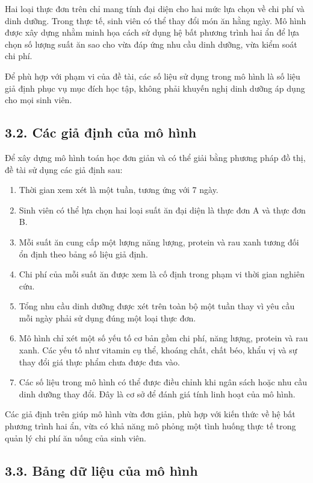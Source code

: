 \documentclass[12pt,a4paper]{article}
\begin{document}
Hai loại thực đơn trên chỉ mang tính đại diện cho hai mức lựa chọn về chi phí và dinh dưỡng. Trong thực tế, sinh viên có thể thay đổi món ăn hằng ngày. Mô hình được xây dựng nhằm minh họa cách sử dụng hệ bất phương trình hai ẩn để lựa chọn số lượng suất ăn sao cho vừa đáp ứng nhu cầu dinh dưỡng, vừa kiểm soát chi phí.

Để phù hợp với phạm vi của đề tài, các số liệu sử dụng trong mô hình là số liệu giả định phục vụ mục đích học tập, không phải khuyến nghị dinh dưỡng áp dụng cho mọi sinh viên.

\subsection*{3.2. Các giả định của mô hình}

Để xây dựng mô hình toán học đơn giản và có thể giải bằng phương pháp đồ thị, đề tài sử dụng các giả định sau:
\begin{enumerate}
    \item Thời gian xem xét là một tuần, tương ứng với 7 ngày.
    \item Sinh viên có thể lựa chọn hai loại suất ăn đại diện là thực đơn A và thực đơn B.
    \item Mỗi suất ăn cung cấp một lượng năng lượng, protein và rau xanh tương đối ổn định theo bảng số liệu giả định.
    \item Chi phí của mỗi suất ăn được xem là cố định trong phạm vi thời gian nghiên cứu.
    \item Tổng nhu cầu dinh dưỡng được xét trên toàn bộ một tuần thay vì yêu cầu mỗi ngày phải sử dụng đúng một loại thực đơn.
    \item Mô hình chỉ xét một số yếu tố cơ bản gồm chi phí, năng lượng, protein và rau xanh. Các yếu tố như vitamin cụ thể, khoáng chất, chất béo, khẩu vị và sự thay đổi giá thực phẩm chưa được đưa vào.
    \item Các số liệu trong mô hình có thể được điều chỉnh khi ngân sách hoặc nhu cầu dinh dưỡng thay đổi. Đây là cơ sở để đánh giá  tính linh hoạt của mô hình.
\end{enumerate}

Các giả định trên giúp mô hình vừa đơn giản, phù hợp với kiến thức về hệ bất phương trình hai ẩn, vừa có khả năng mô phỏng một tình huống thực tế trong quản lý chi phí ăn uống của sinh viên.

\subsection*{3.3. Bảng dữ liệu của mô hình}
\end{document}
